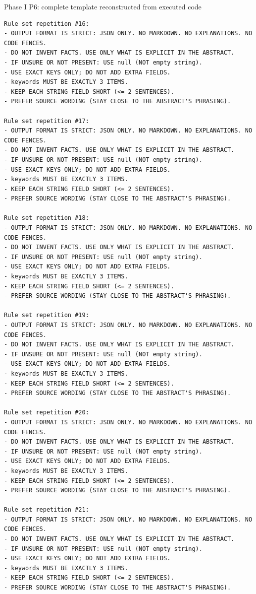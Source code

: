 \documentclass[fleqn,10pt]{wlscirep-authoryear}
\begin{document}
\begin{promptbox}{Phase I P6: complete template reconstructed from executed code}
\begin{lstlisting}[style=promptstyle]
Rule set repetition #16:
- OUTPUT FORMAT IS STRICT: JSON ONLY. NO MARKDOWN. NO EXPLANATIONS. NO CODE FENCES.
- DO NOT INVENT FACTS. USE ONLY WHAT IS EXPLICIT IN THE ABSTRACT.
- IF UNSURE OR NOT PRESENT: USE null (NOT empty string).
- USE EXACT KEYS ONLY; DO NOT ADD EXTRA FIELDS.
- keywords MUST BE EXACTLY 3 ITEMS.
- KEEP EACH STRING FIELD SHORT (<= 2 SENTENCES).
- PREFER SOURCE WORDING (STAY CLOSE TO THE ABSTRACT'S PHRASING).

Rule set repetition #17:
- OUTPUT FORMAT IS STRICT: JSON ONLY. NO MARKDOWN. NO EXPLANATIONS. NO CODE FENCES.
- DO NOT INVENT FACTS. USE ONLY WHAT IS EXPLICIT IN THE ABSTRACT.
- IF UNSURE OR NOT PRESENT: USE null (NOT empty string).
- USE EXACT KEYS ONLY; DO NOT ADD EXTRA FIELDS.
- keywords MUST BE EXACTLY 3 ITEMS.
- KEEP EACH STRING FIELD SHORT (<= 2 SENTENCES).
- PREFER SOURCE WORDING (STAY CLOSE TO THE ABSTRACT'S PHRASING).

Rule set repetition #18:
- OUTPUT FORMAT IS STRICT: JSON ONLY. NO MARKDOWN. NO EXPLANATIONS. NO CODE FENCES.
- DO NOT INVENT FACTS. USE ONLY WHAT IS EXPLICIT IN THE ABSTRACT.
- IF UNSURE OR NOT PRESENT: USE null (NOT empty string).
- USE EXACT KEYS ONLY; DO NOT ADD EXTRA FIELDS.
- keywords MUST BE EXACTLY 3 ITEMS.
- KEEP EACH STRING FIELD SHORT (<= 2 SENTENCES).
- PREFER SOURCE WORDING (STAY CLOSE TO THE ABSTRACT'S PHRASING).

Rule set repetition #19:
- OUTPUT FORMAT IS STRICT: JSON ONLY. NO MARKDOWN. NO EXPLANATIONS. NO CODE FENCES.
- DO NOT INVENT FACTS. USE ONLY WHAT IS EXPLICIT IN THE ABSTRACT.
- IF UNSURE OR NOT PRESENT: USE null (NOT empty string).
- USE EXACT KEYS ONLY; DO NOT ADD EXTRA FIELDS.
- keywords MUST BE EXACTLY 3 ITEMS.
- KEEP EACH STRING FIELD SHORT (<= 2 SENTENCES).
- PREFER SOURCE WORDING (STAY CLOSE TO THE ABSTRACT'S PHRASING).

Rule set repetition #20:
- OUTPUT FORMAT IS STRICT: JSON ONLY. NO MARKDOWN. NO EXPLANATIONS. NO CODE FENCES.
- DO NOT INVENT FACTS. USE ONLY WHAT IS EXPLICIT IN THE ABSTRACT.
- IF UNSURE OR NOT PRESENT: USE null (NOT empty string).
- USE EXACT KEYS ONLY; DO NOT ADD EXTRA FIELDS.
- keywords MUST BE EXACTLY 3 ITEMS.
- KEEP EACH STRING FIELD SHORT (<= 2 SENTENCES).
- PREFER SOURCE WORDING (STAY CLOSE TO THE ABSTRACT'S PHRASING).

Rule set repetition #21:
- OUTPUT FORMAT IS STRICT: JSON ONLY. NO MARKDOWN. NO EXPLANATIONS. NO CODE FENCES.
- DO NOT INVENT FACTS. USE ONLY WHAT IS EXPLICIT IN THE ABSTRACT.
- IF UNSURE OR NOT PRESENT: USE null (NOT empty string).
- USE EXACT KEYS ONLY; DO NOT ADD EXTRA FIELDS.
- keywords MUST BE EXACTLY 3 ITEMS.
- KEEP EACH STRING FIELD SHORT (<= 2 SENTENCES).
- PREFER SOURCE WORDING (STAY CLOSE TO THE ABSTRACT'S PHRASING).


\end{lstlisting}
\end{promptbox}
\end{document}
